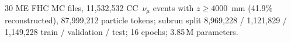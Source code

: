 30 ME FHC MC files, 11{,}532{,}532 CC~$\nu_\mu$ events with $z \ge 4000$~mm (41.9\% reconstructed), 87{,}999{,}212 particle tokens; subrun split 8{,}969{,}228 / 1{,}121{,}829 / 1{,}149{,}228 train / validation / test; 16 epochs; 3.85\,M parameters.
